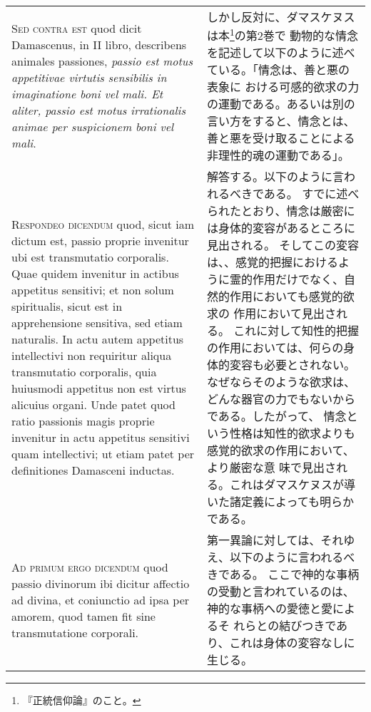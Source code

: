 \documentclass[10pt]{jsarticle} %
\begin{document}
\begin{longtable}{p{21em}p{21em}}
\\



{\scshape Sed contra est} quod dicit Damascenus, in II libro, describens animales
passiones, {\itshape passio est motus appetitivae virtutis sensibilis in
imaginatione boni vel mali. Et aliter, passio est motus irrationalis
animae per suspicionem boni vel mali}.

&

しかし反対に、ダマスケヌスは本\footnote{『正統信仰論』のこと。}の第2巻で
 動物的な情念を記述して以下のように述べている。「情念は、善と悪の表象に
 おける可感的欲求の力の運動である。あるいは別の言い方をすると、情念とは、
 善と悪を受け取ることによる非理性的魂の運動である」。


\\



{\scshape Respondeo dicendum} quod, sicut iam dictum est, passio proprie invenitur
ubi est transmutatio corporalis. Quae quidem invenitur in actibus
appetitus sensitivi; et non solum spiritualis, sicut est in
apprehensione sensitiva, sed etiam naturalis. In actu autem appetitus
intellectivi non requiritur aliqua transmutatio corporalis, quia
huiusmodi appetitus non est virtus alicuius organi. Unde patet quod
ratio passionis magis proprie invenitur in actu appetitus sensitivi quam
intellectivi; ut etiam patet per definitiones Damasceni inductas.

&

解答する。以下のように言われるべきである。
すでに述べられたとおり、情念は厳密には身体的変容があるところに見出される。
そしてこの変容は、、感覚的把握におけるように霊的作用だけでなく、自然的作用においても感覚的欲求の
 作用において見出される。
これに対して知性的把握の作用においては、何らの身体的変容も必要とされない。
 なぜならそのような欲求は、どんな器官の力でもないからである。したがって、
 情念という性格は知性的欲求よりも感覚的欲求の作用において、より厳密な意
 味で見出される。これはダマスケヌスが導いた諸定義によっても明らかである。


\\



{\scshape Ad primum ergo dicendum} quod passio divinorum ibi dicitur affectio ad
divina, et coniunctio ad ipsa per amorem, quod tamen fit sine
transmutatione corporali.

&

第一異論に対しては、それゆえ、以下のように言われるべきである。
ここで神的な事柄の受動と言われているのは、神的な事柄への愛徳と愛によるそ
 れらとの結びつきであり、これは身体の変容なしに生じる。



\end{longtable}
\end{document}
